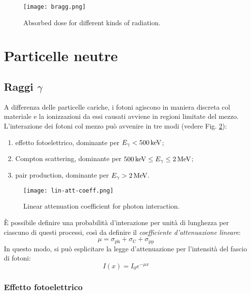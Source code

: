 \begin{figure}[!t]
	\centering
	\texttt{[image: bragg.png]}
	\caption{Absorbed dose for different kinds of radiation.}
	\label{bragg}
\end{figure}

\section{Particelle neutre}

\subsection{Raggi \texorpdfstring{$ \gamma $}{TEXT}}

A differenza delle particelle cariche, i fotoni agiscono in maniera discreta col materiale e la ionizzazioni da essi causati avviene in regioni limitate del mezzo.\\
L'interazione dei fotoni col mezzo può avvenire in tre modi (vedere Fig. \ref{ph-i-p}):
\begin{enumerate}
	\item effetto fotoelettrico, dominante per $ E_{\gamma} < 500 \,\mathrm{keV} $;
	\item Compton scattering, dominante per $ 500 \,\mathrm{keV} \le E_{\gamma} \le 2 \,\mathrm{MeV} $;
	\item pair production, dominante per $ E_{\gamma} > 2 \,\mathrm{MeV} $.
\end{enumerate}

\begin{figure}[!b]
	\centering
	\texttt{[image: lin-att-coeff.png]}
	\caption{Linear attenuation coefficient for photon interaction.}
	\label{ph-i-p}
\end{figure}

È possibile definire una probabilità d'interazione per unità di lunghezza per ciascuno di questi processi, così da definire il \textit{coefficiente d'attenuazione lineare}:
\begin{equation}
	\mu = \sigma_{\text{ph}} + \sigma_{\text{C}} + \sigma_{\text{pp}}
	\label{eq:3.7}
\end{equation}
In questo modo, si può esplicitare la legge d'attenuazione per l'intensità del fascio di fotoni:
\begin{equation}
	I(x) = I_0 e^{-\mu x}
	\label{eq:3.8}
\end{equation}

\subsubsection{Effetto fotoelettrico}


